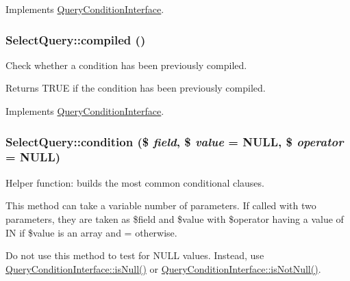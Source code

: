 Implements \hyperlink{interfaceQueryConditionInterface_ad409672ac9ac50787eec52ecdf5a60b1}{QueryConditionInterface}.\hypertarget{classSelectQuery_adc1283f0d5b5f20ed7a69bf8bee7e935}{
\subsubsection[{compiled}]{\setlength{\rightskip}{0pt plus 5cm}SelectQuery::compiled ()}}
\label{classSelectQuery_adc1283f0d5b5f20ed7a69bf8bee7e935}
Check whether a condition has been previously compiled.

\begin{DoxyReturn}{Returns}
TRUE if the condition has been previously compiled. 
\end{DoxyReturn}


Implements \hyperlink{interfaceQueryConditionInterface_a4aac3f4505275edecad9c22351e591cb}{QueryConditionInterface}.\hypertarget{classSelectQuery_a742732edee2dc50e19be1d2cdb09537b}{
\subsubsection[{condition}]{\setlength{\rightskip}{0pt plus 5cm}SelectQuery::condition (\$ {\em field}, \/  \$ {\em value} = {\ttfamily NULL}, \/  \$ {\em operator} = {\ttfamily NULL})}}
\label{classSelectQuery_a742732edee2dc50e19be1d2cdb09537b}
Helper function: builds the most common conditional clauses.

This method can take a variable number of parameters. If called with two parameters, they are taken as \$field and \$value with \$operator having a value of IN if \$value is an array and = otherwise.

Do not use this method to test for NULL values. Instead, use \hyperlink{interfaceQueryConditionInterface_a2978b536a3fe62b21e940366c9cb5923}{QueryConditionInterface::isNull()} or \hyperlink{interfaceQueryConditionInterface_a8bbb6acc9c72911b165cf6eb1dc31453}{QueryConditionInterface::isNotNull()}.


